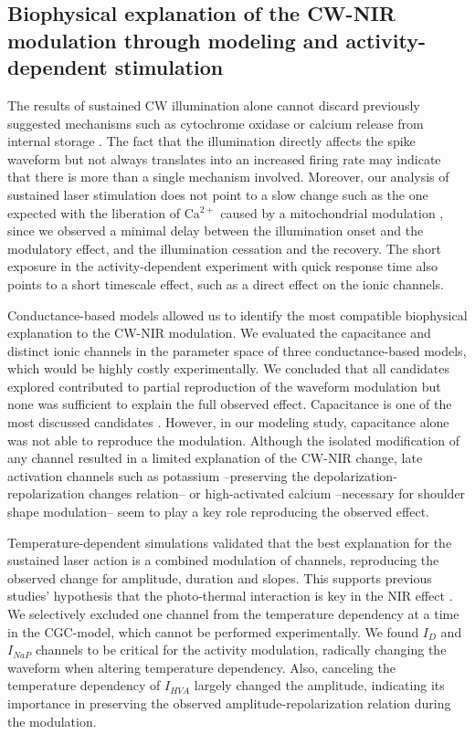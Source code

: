 \subsection{Biophysical explanation of the CW-NIR modulation through modeling and activity-dependent stimulation}
The results of sustained CW illumination alone cannot discard previously suggested mechanisms such as cytochrome oxidase \parencite{wang_impact_2017,saucedo_transcranial_2021} or calcium release from internal storage \parencite{lumbreras_pulsed_2014}. The fact that the illumination directly affects the spike waveform but not always translates into an increased firing rate may indicate that there is more than a single mechanism involved. Moreover, our analysis of sustained laser stimulation does not point to a slow change such as the one expected with the liberation of Ca$^{2+}$ caused by a mitochondrial modulation \parencite{dittami_intracellular_2011,lumbreras_pulsed_2014}, since we observed a minimal delay between the illumination onset and the modulatory effect, and the illumination cessation and the recovery. The short exposure in the activity-dependent experiment with quick response time also points to a short timescale effect, such as a direct effect on the ionic channels.

Conductance-based models allowed us to identify the most compatible biophysical explanation to the CW-NIR modulation. We evaluated the capacitance and distinct ionic channels in the parameter space of three conductance-based models, which would be highly costly experimentally. We concluded that all candidates explored contributed to partial reproduction of the waveform modulation but none was sufficient to explain the full observed effect. Capacitance is one of the most discussed candidates \parencite{shapiro_infrared_2012,cayce_infrared_2014,thompson_infrared_2015,plaksin_thermal_2018}. However, in our modeling study, capacitance alone was not able to reproduce the modulation. Although the isolated modification of any channel resulted in a limited explanation of the CW-NIR change, late activation channels such as potassium --preserving the depolarization-repolarization changes relation-- or high-activated calcium --necessary for shoulder shape modulation-- seem to play a key role reproducing the observed effect.

Temperature-dependent simulations validated that the best explanation for the sustained laser action is a combined modulation of channels, reproducing the observed change for amplitude, duration and slopes. This supports previous studies' hypothesis that the photo-thermal interaction is key in the NIR effect \parencite{wells_application_2005,li_temporal_2013,albert_trpv4_2012,rabbitt_heat_2016, barrett_pulsed_2018,brown_thermal_2020,cury_infrared_2021}. We selectively excluded one channel from the temperature dependency at a time in the CGC-model, which cannot be performed experimentally. We found $I_D$ and $I_{NaP}$ channels to be critical for the activity modulation, radically changing the waveform when altering temperature dependency. Also, canceling the temperature dependency of $I_{HVA}$ largely changed the amplitude, indicating its importance in preserving the observed amplitude-repolarization relation during the modulation.

